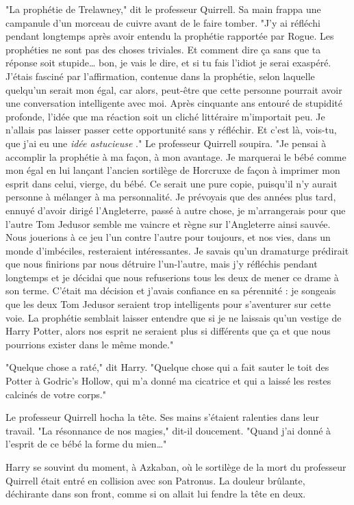 "La prophétie de Trelawney," dit le professeur Quirrell. Sa main frappa une campanule d'un morceau de cuivre avant de le faire tomber. "J'y ai réfléchi pendant longtemps après avoir entendu la prophétie rapportée par Rogue. Les prophéties ne sont pas des choses triviales. Et comment dire ça sans que ta réponse soit stupide… bon, je vais le dire, et si tu fais l'idiot je serai exaspéré. J'étais fasciné par l'affirmation, contenue dans la prophétie, selon laquelle quelqu'un serait mon égal, car alors, peut-être que cette personne pourrait avoir une conversation intelligente avec moi. Après cinquante ans entouré de stupidité profonde, l'idée que ma réaction soit un cliché littéraire m'importait peu. Je n'allais pas laisser passer cette opportunité sans y réfléchir. Et c'est là, vois-tu, que j'ai eu une \emph{idée astucieuse} ." Le professeur Quirrell soupira. "Je pensai à accomplir la prophétie à ma façon, à mon avantage. Je marquerai le bébé comme mon égal en lui lançant l'ancien sortilège de Horcruxe de façon à imprimer mon esprit dans celui, vierge, du bébé. Ce serait une pure copie, puisqu'il n'y aurait personne à mélanger à ma personnalité. Je prévoyais que des années plus tard, ennuyé d'avoir dirigé l'Angleterre, passé à autre chose, je m'arrangerais pour que l'autre Tom Jedusor semble me vaincre et règne sur l'Angleterre ainsi sauvée. Nous jouerions à ce jeu l'un contre l'autre pour toujours, et nos vies, dans un monde d'imbéciles, resteraient intéressantes. Je savais qu'un dramaturge prédirait que nous finirions par nous détruire l'un-l'autre, mais j'y réfléchis pendant longtemps et je décidai que nous refuserions tous les deux de mener ce drame à son terme. C'était ma décision et j'avais confiance en sa pérennité : je songeais que les deux Tom Jedusor seraient trop intelligents pour s'aventurer sur cette voie. La prophétie semblait laisser entendre que si je ne laissais qu'un vestige de Harry Potter, alors nos esprit ne seraient plus si différents que ça et que nous pourrions exister dans le même monde."

"Quelque chose a raté," dit Harry. "Quelque chose qui a fait sauter le toit des Potter à Godric's Hollow, qui m'a donné ma cicatrice et qui a laissé les restes calcinés de votre corps."

Le professeur Quirrell hocha la tête. Ses mains s'étaient ralenties dans leur travail. "La résonnance de nos magies," dit-il doucement. "Quand j'ai donné à l'esprit de ce bébé la forme du mien…"

Harry se souvint du moment, à Azkaban, où le sortilège de la mort du professeur Quirrell était entré en collision avec son Patronus. La douleur brûlante, déchirante dans son front, comme si on allait lui fendre la tête en deux.

